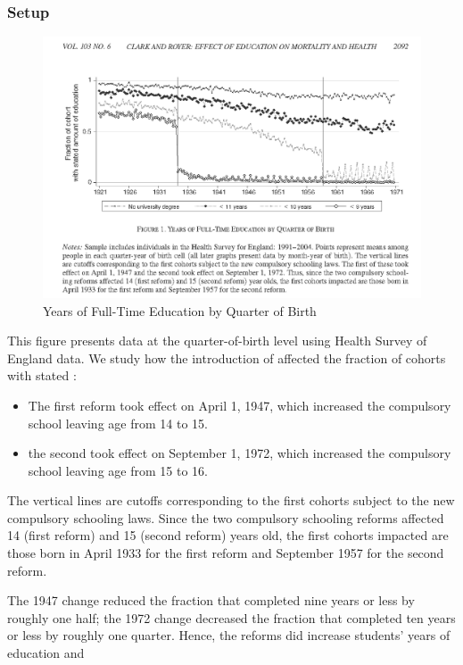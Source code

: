         \subsubsection{Setup}
            \begin{figure}[H]
                \centering
                \includegraphics[width=5in]{images/ch3/35.png}
                \caption{Years of Full-Time Education by Quarter of Birth}
            \end{figure}
            This figure presents data at the quarter-of-birth level using Health Survey of England data. We study how the introduction of  affected the fraction of cohorts with stated :
            \begin{itemize}
                \item The first reform took effect on April 1, 1947, which increased the compulsory school leaving age from 14 to 15.
                \item the second took effect on September 1, 1972, which increased the compulsory school leaving age from 15 to 16.
            \end{itemize}
            The vertical lines are cutoffs corresponding to the first cohorts subject to the new compulsory schooling laws. Since the two compulsory schooling reforms affected 14 (first reform) and 15 (second reform) years old, the first cohorts impacted are those born in April 1933 for the first reform and September 1957 for the second reform.
                     
            The 1947 change reduced the fraction that completed nine years or less by roughly one half; the 1972 change decreased the fraction that completed ten years or less by roughly one quarter. Hence, the reforms did increase students' years of education and 

